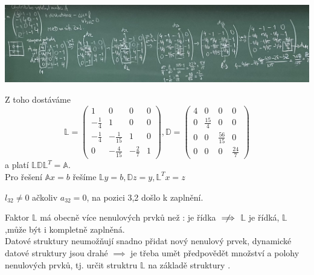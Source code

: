 \documentclass[../main.tex]{subfiles}
\begin{document}
\begin{example}
    
    
\begin{center}
    \includegraphics[width=\linewidth]{images/12-10-example.jpg}
\end{center}

Z toho dostáváme 
\begin{equation*}
    \mathbb{L} = \begin{pmatrix}
        1 & 0 & 0 & 0 \\
        -\frac{1}{4} & 1 & 0 & 0 \\
        -\frac{1}{4} & -\frac{1}{15} & 1 & 0 \\
        0 & -\frac{4}{15} & -\frac{2}{7} & 1 
        \end{pmatrix} , \mathbb{D} = \begin{pmatrix}
            4 & 0 & 0 & 0 \\
            0 & \frac{15}{4} & 0 & 0 \\
            0 & 0 & \frac{56}{15} & 0 \\
            0 & 0 & 0 & \frac{24}{7} 
            \end{pmatrix}
\end{equation*}
a platí $\mathbb{L}\mathbb{D}\mathbb{L}^T = \mathbb{A}$.\\
Pro řešení $\mathbb{A}x = b$ řešíme $\mathbb{L}y = b, \mathbb{D}z = y, \mathbb{L}^T x = z$
\end{example}

\begin{remark}

    $l_{32} \neq 0$ ačkoliv $a_{32} = 0$, na pozici 3,2 došlo k zaplnění.

    Faktor $\mathbb{L}$ má obecně více nenulových prvků než \matA : \matA je řídka $\centernot\implies$ $\mathbb{L}$ je řídká, $\mathbb{L}$ ,může být i kompletně zaplněná.\\
    Datové struktury neumožňují snadno přidat nový nenulový prvek, dynamické datové struktury jsou drahé
    $\implies$ je třeba umět předpovědět množství a polohy nenulových prvků, tj. určit struktru 
    $\mathbb{L}$ na základě struktury \matA .
\end{remark}
\end{document}
